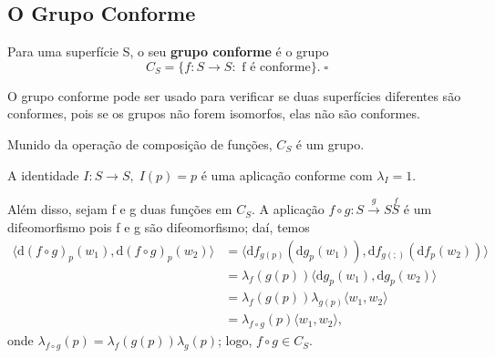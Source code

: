 \documentclass[../differential_geometry.tex]{subfiles}
\begin{document}
\subsection{O Grupo Conforme}
\begin{def*}
	Para uma superfície S, o seu \textbf{grupo conforme} é o grupo
	\[
		C_S = \{f:S\rightarrow S:\text{ f é conforme}\}. \; \square
	\]
\end{def*}
O grupo conforme pode ser usado para verificar se duas superfícies diferentes são conformes, pois se os grupos não forem isomorfos, elas não são conformes.
\begin{theorem*}
	Munido da operação de composição de funções, \(C_S\) é um grupo.
\end{theorem*}
\begin{proof*}
	A identidade \(I:S\rightarrow S,\; I(p) = p\) é uma aplicação conforme com \(\lambda_{I} = 1\).

	Além disso, sejam f e g duas funções em \(C_{S}\). A aplicação \(f\circ g:S\stackrel{g}\rightarrow S\stackrel{f}S\) é um difeomorfismo pois f e g são difeomorfismo; daí, temos
	\begin{align*}
		\langle \mathrm{d}(f\circ g)_{p}(w_1), \mathrm{d}(f\circ g)_{p}(w_2) \rangle & = \langle \mathrm{d}f_{g(p)}(\mathrm{d}g_{p}(w_1)), \mathrm{d}f_{g(;)}(\mathrm{d}f_{p}(w_2)) \rangle \\
		                                                                             & = \lambda_f(g(p))\langle \mathrm{d}g_{p}(w_1), \mathrm{d}g_p(w_2) \rangle                            \\
		                                                                             & = \lambda_{f}(g(p))\lambda_{g(p)}\langle w_1, w_2 \rangle                                            \\
		                                                                             & = \lambda_{f\circ g}(p)\langle w_1, w_2 \rangle,
	\end{align*}
	onde \(\lambda_{f\circ g}(p) = \lambda_{f}(g(p))\lambda_{g}(p)\); logo, \(f\circ g\in C_{S}\).


\end{proof*}
\end{document}
